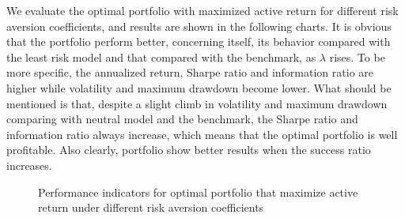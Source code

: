 \documentclass[10pt]{article}
\begin{document}
We evaluate the optimal portfolio with maximized active return for different risk aversion coefficients, and results are shown in the following charts. It is obvious that the portfolio perform better, concerning itself, its behavior compared with the least risk model and that compared with the benchmark, as $\lambda$ rises. To be more specific, the annualized return, Sharpe ratio and information ratio are higher while volatility and maximum drawdown become lower. What should be mentioned is that, despite a slight climb in volatility and maximum drawdown comparing with neutral model and the benchmark, the Sharpe ratio and information ratio always increase, which means that the optimal portfolio is well profitable. Also clearly, portfolio show better results when the success ratio increases.
\begin{figure}[htbp]
\centering
{}
\quad
{}
\quad
{}
\quad
{}
\caption{Performance indicators for optimal portfolio that maximize active return under different risk aversion coefficients}
\end{figure}
\\
\end{document}
